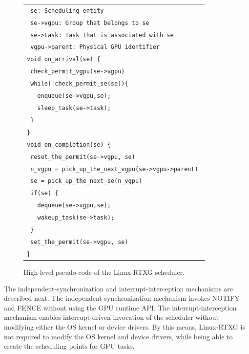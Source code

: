 \begin{figure}[!t]
\begin{center}
\begin{tabular}{l}
\hline
{\scriptsize \verb| se: Scheduling entity |}\\
{\scriptsize \verb| se->vgpu: Group that belongs to se|}\\
{\scriptsize \verb| se->task: Task that is associated with se |}\\
{\scriptsize \verb| vgpu->parent: Physical GPU identifier|}\\
\hline
{\scriptsize \verb|void on_arrival(se) {|}\\
{\scriptsize \verb| check_permit_vgpu(se->vgpu)    |}\\
{\scriptsize \verb| while(!check_permit_se(se)){|}\\
{\scriptsize \verb|   enqueue(se->vgpu,se); |}\\
{\scriptsize \verb|   sleep_task(se->task); |}\\
{\scriptsize \verb| }|}\\
{\scriptsize \verb|}|}\\
{\scriptsize \verb|void on_completion(se) {|}\\
{\scriptsize \verb| reset_the_permit(se->vgpu, se)|}\\
{\scriptsize \verb| n_vgpu = pick_up_the_next_vgpu(se->vgpu->parent) |}\\
{\scriptsize \verb| se = pick_up_the_next_se(n_vgpu)|}\\
{\scriptsize \verb| if(se) {|}\\
{\scriptsize \verb|   dequeue(se->vgpu,se);|}\\
{\scriptsize \verb|   wakeup_task(se->task);|}\\
{\scriptsize \verb| }|}\\
{\scriptsize \verb| set_the_permit(se->vgpu, se)|}\\
{\scriptsize \verb|}|}\\
\hline
\end{tabular}
\caption{High-level pseudo-code of the Linux-RTXG scheduler.}
\vspace{-8mm}
\label{fig:scheduling}
\end{center}
\end{figure}

The independent-synchronization and interrupt-interception mechanisms are described next.
The independent-synchronization mechanism invokes NOTIFY and FENCE without using the GPU runtime API.
The interrupt-interception mechanism enables interrupt-driven invocation of the scheduler without modifying either the OS kernel or device drivers.
By this means, Linux-RTXG is not required to modify the OS kernel and device drivers, while being able to create the scheduling points for GPU tasks.

